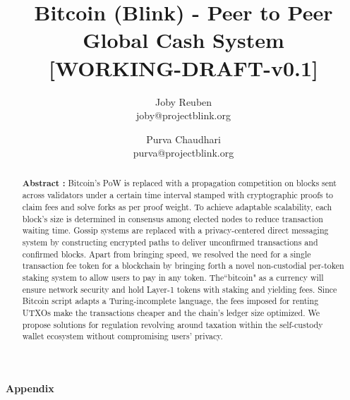 \documentclass[a4paper,10pt]{article}
\title{
 \large \textbf{Bitcoin (Blink) - Peer to Peer Global Cash System}\\
\vspace{6mm}
\scriptsize[WORKING-DRAFT-v0.1]
}
\author{ \myfontt Joby Reuben \\ \myfontt joby@projectblink.org \and  \myfontt Purva Chaudhari \\ \myfontt purva@projectblink.org}
\date{}
\begin{document}
\maketitle
\begin{abstract}
\noindent \textbf{Abstract :} Bitcoin's PoW is replaced with a propagation competition on blocks sent across validators under a certain time interval stamped with cryptographic proofs to claim fees and solve forks as per proof weight. To achieve adaptable scalability, each block's size is determined in consensus among elected nodes to reduce transaction waiting time. Gossip systems are replaced with a privacy-centered direct messaging system by constructing encrypted paths to deliver unconfirmed transactions and confirmed blocks. Apart from bringing speed, we resolved the need for a single transaction fee token for a blockchain by bringing forth a novel non-custodial per-token staking system to allow users to pay in any token. The``bitcoin" as a currency will ensure network security and hold Layer-1 tokens with staking and yielding fees. Since Bitcoin script adapts a Turing-incomplete language, the fees imposed for renting UTXOs make the transactions cheaper and the chain's ledger size optimized. We propose solutions for regulation revolving around taxation within the self-custody wallet ecosystem without compromising users' privacy. 
\end{abstract}














\newpage
\appendix
\noindent \Large \textbf{Appendix}





















\end{document}
